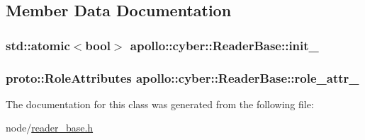 \subsection{Member Data Documentation}
\hypertarget{classapollo_1_1cyber_1_1ReaderBase_a1069158d442f829dcfe467b45c7dd39a}{
\subsubsection[{init\-\_\-}]{\setlength{\rightskip}{0pt plus 5cm}std\-::atomic$<$bool$>$ apollo\-::cyber\-::\-Reader\-Base\-::init\-\_\-\hspace{0.3cm}{\ttfamily [protected]}}}\label{classapollo_1_1cyber_1_1ReaderBase_a1069158d442f829dcfe467b45c7dd39a}
\hypertarget{classapollo_1_1cyber_1_1ReaderBase_abb179fb694df505798fc959ff51614ed}{
\subsubsection[{role\-\_\-attr\-\_\-}]{\setlength{\rightskip}{0pt plus 5cm}proto\-::\-Role\-Attributes apollo\-::cyber\-::\-Reader\-Base\-::role\-\_\-attr\-\_\-\hspace{0.3cm}{\ttfamily [protected]}}}\label{classapollo_1_1cyber_1_1ReaderBase_abb179fb694df505798fc959ff51614ed}


The documentation for this class was generated from the following file\-:\begin{DoxyCompactItemize}
\item 
node/\hyperlink{reader__base_8h}{reader\-\_\-base.\-h}\end{DoxyCompactItemize}
